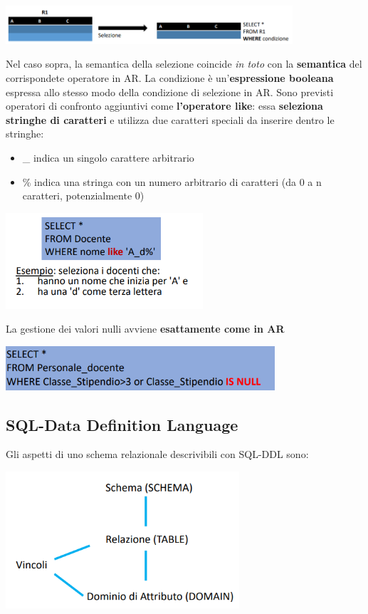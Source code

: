 \documentclass[12pt]{article}
\begin{document}
\begin{center}
    \includegraphics[width = 0.80\textwidth]{Images/171.PNG}
\end{center}
Nel caso sopra, la semantica della selezione coincide \textit{in toto} con la \textbf{semantica} del corrispondete operatore in AR.
La condizione è un'\textbf{espressione booleana} espressa allo stesso modo della condizione di selezione in AR. Sono previsti operatori di confronto aggiuntivi come \textbf{l'operatore like}:
essa \textbf{seleziona stringhe di caratteri} e utilizza due caratteri speciali da inserire dentro le stringhe:
\begin{itemize}
    \item \_ indica un singolo carattere arbitrario
    \item \% indica una stringa con un numero arbitrario di caratteri (da 0 a n caratteri, potenzialmente 0)
\end{itemize}
\begin{center}
    \includegraphics[width = 0.55\textwidth]{Images/172.PNG}
\end{center}
La gestione dei valori nulli avviene \textbf{esattamente come in AR}
\begin{center}
    \includegraphics[width = 0.75\textwidth]{Images/173.PNG}
\end{center}
\subsection{SQL-Data Definition Language}
Gli aspetti di uno schema relazionale descrivibili con SQL-DDL sono:
\begin{center}
    \includegraphics[width = 0.65\textwidth]{Images/174.PNG}
\end{center}
\end{document}
